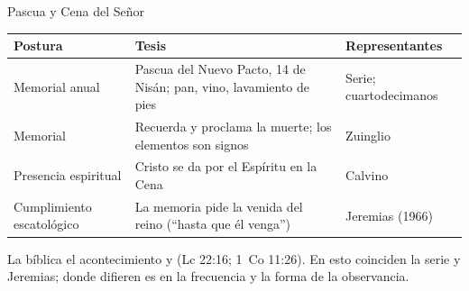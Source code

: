 \begin{frame}{Pascua y Cena del Señor}
\scriptsize\renewcommand{\arraystretch}{1.12}
\begin{tabular}{@{}L{3.0cm}L{6.2cm}L{2.9cm}@{}}
\toprule
\textbf{Postura} & \textbf{Tesis} & \textbf{Representantes} \\ \midrule
Memorial anual & Pascua del Nuevo Pacto, 14 de Nisán; pan, vino, lavamiento de pies & Serie; cuartodecimanos \\
Memorial & Recuerda y proclama la muerte; los elementos son signos & Zuinglio \\
Presencia espiritual & Cristo se da por el Espíritu en la Cena & Calvino \\
Cumplimiento escatológico & La memoria pide la venida del reino (``hasta que él venga'') & Jeremias (1966) \\
\bottomrule
\end{tabular}\par\medskip
\small\RaggedRight La  bíblica  el acontecimiento y  (Lc 22:16; 1~Co 11:26). En esto coinciden la serie y Jeremias; donde difieren es en la frecuencia y la forma de la observancia.
\end{frame}

